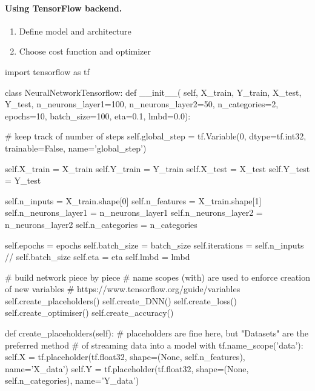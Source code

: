 \documentclass[%
oneside,                 %
final,                   %
10pt]{article}
\begin{document}
\paragraph{Using TensorFlow backend.}
\begin{enumerate}
\item Define model and architecture

\item Choose cost function and optimizer
\end{enumerate}

\noindent
\bpycod
import tensorflow as tf

class NeuralNetworkTensorflow:
    def __init__(
            self,
            X_train,
            Y_train,
            X_test,
            Y_test,
            n_neurons_layer1=100,
            n_neurons_layer2=50,
            n_categories=2,
            epochs=10,
            batch_size=100,
            eta=0.1,
            lmbd=0.0):
        
        # keep track of number of steps
        self.global_step = tf.Variable(0, dtype=tf.int32, trainable=False, name='global_step')
        
        self.X_train = X_train
        self.Y_train = Y_train
        self.X_test = X_test
        self.Y_test = Y_test
        
        self.n_inputs = X_train.shape[0]
        self.n_features = X_train.shape[1]
        self.n_neurons_layer1 = n_neurons_layer1
        self.n_neurons_layer2 = n_neurons_layer2
        self.n_categories = n_categories
        
        self.epochs = epochs
        self.batch_size = batch_size
        self.iterations = self.n_inputs // self.batch_size
        self.eta = eta
        self.lmbd = lmbd
        
        # build network piece by piece
        # name scopes (with) are used to enforce creation of new variables
        # https://www.tensorflow.org/guide/variables
        self.create_placeholders()
        self.create_DNN()
        self.create_loss()
        self.create_optimiser()
        self.create_accuracy()
    
    def create_placeholders(self):
        # placeholders are fine here, but "Datasets" are the preferred method
        # of streaming data into a model
        with tf.name_scope('data'):
            self.X = tf.placeholder(tf.float32, shape=(None, self.n_features), name='X_data')
            self.Y = tf.placeholder(tf.float32, shape=(None, self.n_categories), name='Y_data')
    
\end{document}
